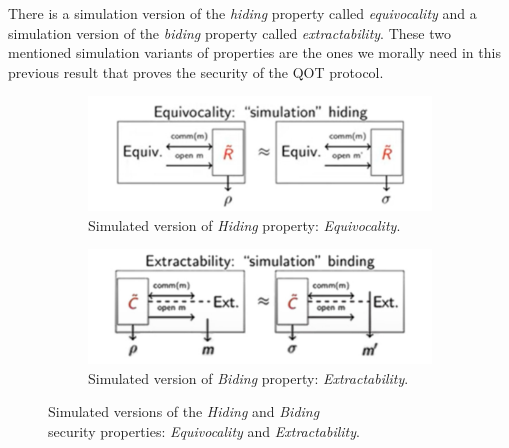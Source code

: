 \documentclass[12pt]{article}
\begin{document}
    \noindent There is a simulation version of the \textit{hiding} property called \textit{equivocality} and a simulation version of the \textit{biding} property called \textit{extractability}. These two mentioned simulation variants of properties are the ones we morally need in this previous result that proves the security of the QOT protocol. 
    
    \begin{figure}[ht]
        \captionsetup{justification=centering}
        \centering
        \begin{subfigure}{.5\textwidth}
            \centering
            \includegraphics[width=\linewidth]{figures/images/img-9.pdf}
            \caption{Simulated version of \textit{Hiding} property: \textit{Equivocality}.}
            \label{fig:simulated-version-hiding-property-equivocality}
        \end{subfigure}%
        \begin{subfigure}{.5\textwidth}
            \centering
            \includegraphics[width=\linewidth]{figures/images/img-10.pdf}
            \caption{Simulated version of \textit{Biding} property: \textit{Extractability}.}
            \label{fig:simulated-version-biding-property-extractability}
        \end{subfigure}
        \caption{Simulated versions of the \textit{Hiding} and \textit{Biding}\\ security properties: \textit{Equivocality} and \textit{Extractability}.}
        \label{fig:simulated-versions-hiding-and-biding-properties-equivocality-and-extractability}
    \end{figure}
    
\end{document}
